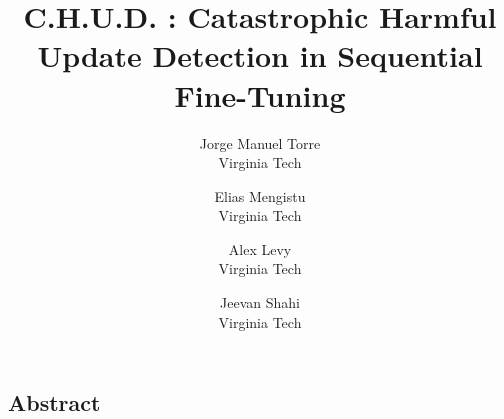\documentclass[letterpaper,twocolumn,10pt]{article}
\begin{document}
\date{}

\title{\Large \bf C.H.U.D. : Catastrophic Harmful Update Detection in Sequential Fine-Tuning}

\author{
{\rm Jorge Manuel Torre}\\
Virginia Tech
\and
{\rm Elias Mengistu}\\
Virginia Tech  \\
\and
{\rm Alex Levy}\\
Virginia Tech \\
\and
{\rm Jeevan Shahi}\\
Virginia Tech
}

\maketitle

\thispagestyle{empty}


\subsection*{Abstract}


\end{document}

